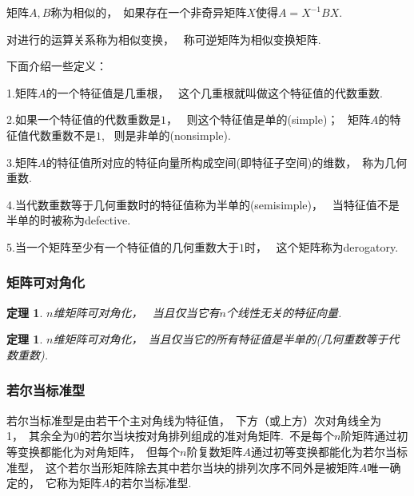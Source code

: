 \documentclass{article}
\begin{document}
\begin{definition}
矩阵$A,B$称为相似的，~如果存在一个非奇异矩阵$X$使得$A=X^{-1}BX.$  
\end{definition}

对进行的运算关系称为相似变换，~ 称可逆矩阵为相似变换矩阵.

下面介绍一些定义：

1.矩阵$A$的一个特征值是几重根，~ 这个几重根就叫做这个特征值的代数重数.

2.如果一个特征值的代数重数是$1$，~ 则这个特征值是单的(simple)；~ 矩阵$A$的特征值代数重数不是$1$,~ 则是非单的(nonsimple).

3.矩阵$A$的特征值所对应的特征向量所构成空间(即特征子空间)的维数，~称为几何重数.

4.当代数重数等于几何重数时的特征值称为半单的(semisimple)，~ 当特征值不是半单的时被称为defective.

5.当一个矩阵至少有一个特征值的几何重数大于$1$时，~ 这个矩阵称为derogatory.
\subsubsection{矩阵可对角化}
\newtheorem{thm}{定理}
\begin{thm}
$n$维矩阵可对角化，~ 当且仅当它有$n$个线性无关的特征向量.
\end{thm}

\newtheorem{thm}{定理}
\begin{thm}
$n$维矩阵可对角化，~当且仅当它的所有特征值是半单的(几何重数等于代数重数).
\end{thm}

\subsubsection{若尔当标准型}
\begin{definition}
若尔当标准型是由若干个主对角线为特征值，~下方（或上方）次对角线全为1，~其余全为0的若尔当块按对角排列组成的准对角矩阵.~不是每个$n$阶矩阵通过初等变换都能化为对角矩阵，~但每个$n$阶复数矩阵$A$通过初等变换都能化为若尔当标准型，~这个若尔当形矩阵除去其中若尔当块的排列次序不同外是被矩阵$A$唯一确定的，~它称为矩阵$A$的若尔当标准型.
\end{definition}
\end{document}
